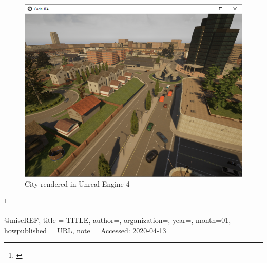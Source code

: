 \begin{figure}[!tbp]
\begin{minipage}[b]{0.5\textwidth}
    \includegraphics[width=\linewidth]{chapters/chapter6_bruno/Figures/UECity1.png}
    \caption{City rendered in Unreal Engine 4}
    \label{6fig:cityRender}
  \end{minipage}
\end{figure}



\footnote
    {\href{}
    {}}



@misc{REF,
  title = {TITLE},
  author={},
  organization={},
  year={},
  month={01},
  howpublished = {URL},
  note = {Accessed: 2020-04-13}
}